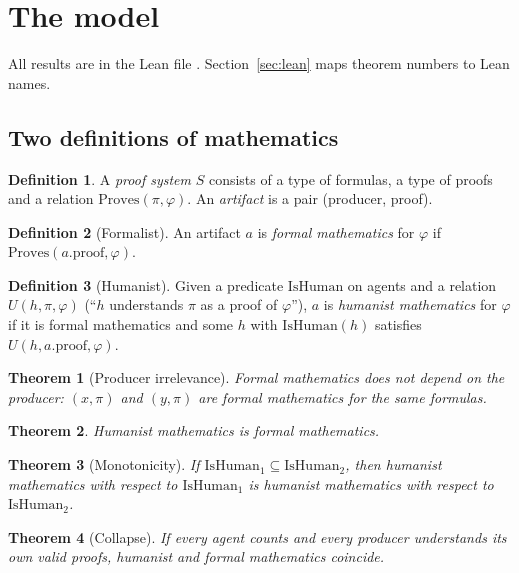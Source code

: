 \documentclass[11pt]{article}
\newtheorem{theorem}{Theorem}
\theoremstyle{definition}
\newtheorem{definition}{Definition}
\theoremstyle{remark}
\begin{document}
\section{The model}\label{sec:model}

All results are in the Lean file . Section~\ref{sec:lean} maps
theorem numbers to Lean names.

\subsection{Two definitions of mathematics}

\begin{definition}
A \emph{proof system} $S$ consists of a type of formulas, a type of proofs and a relation
$\mathrm{Proves}(\pi,\varphi)$. An \emph{artifact} is a pair (producer, proof).
\end{definition}

\begin{definition}[Formalist]
An artifact $a$ is \emph{formal mathematics} for $\varphi$ if $\mathrm{Proves}(a.\mathrm{proof},
\varphi)$.
\end{definition}

\begin{definition}[Humanist]
Given a predicate $\mathrm{IsHuman}$ on agents and a relation $U(h,\pi,\varphi)$ (``$h$
understands $\pi$ as a proof of $\varphi$''), $a$ is \emph{humanist mathematics} for $\varphi$
if it is formal mathematics and some $h$ with $\mathrm{IsHuman}(h)$ satisfies
$U(h, a.\mathrm{proof}, \varphi)$.
\end{definition}

\begin{theorem}[Producer irrelevance]
Formal mathematics does not depend on the producer: $(x,\pi)$ and $(y,\pi)$ are formal
mathematics for the same formulas.
\end{theorem}

\begin{theorem}
Humanist mathematics is formal mathematics.
\end{theorem}

\begin{theorem}[Monotonicity]
If $\mathrm{IsHuman}_1 \subseteq \mathrm{IsHuman}_2$, then humanist mathematics with respect to
$\mathrm{IsHuman}_1$ is humanist mathematics with respect to $\mathrm{IsHuman}_2$.
\end{theorem}

\begin{theorem}[Collapse]
If every agent counts and every producer understands its own valid proofs, humanist and formal
mathematics coincide.
\end{theorem}
\end{document}
